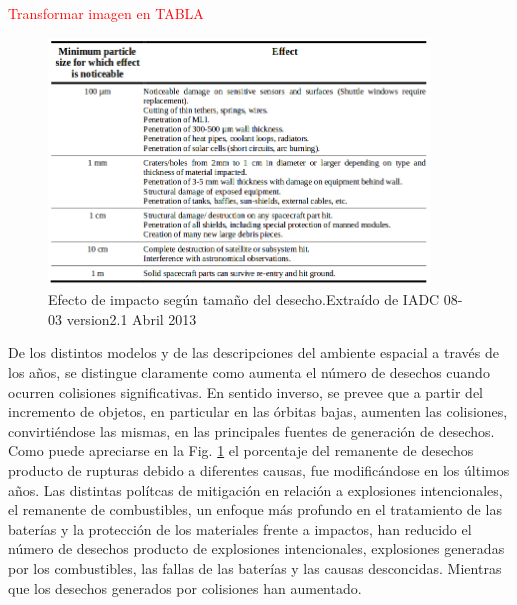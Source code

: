 \textcolor{red}{Transformar imagen en TABLA}
\begin{figure}[!h]
  \centering
  \includegraphics[width=0.9\textwidth]{imagenes/danioxtamanio}
  \caption[Efecto de impacto seg\'un tama\~no del desecho.]{Efecto de impacto seg\'un tama\~no del desecho.Extra\'ido de IADC 08-03 version2.1 Abril 2013 }
  \label{fig:causadesechos}
\end{figure}


De los distintos modelos y de las descripciones del ambiente espacial a trav\'es de los a\~nos, se distingue claramente como aumenta el n\'umero de desechos cuando ocurren colisiones significativas. En sentido inverso, se prevee que a partir del incremento de objetos, en particular en las \'orbitas bajas, aumenten las colisiones, convirti\'endose las mismas, en las principales fuentes de generaci\'on de desechos.\\ 

Como puede apreciarse en la Fig. \ref{fig:causadesechos} el porcentaje del remanente de desechos producto de rupturas debido a diferentes causas, fue modific\'andose en los \'ultimos a\~nos. Las distintas pol\'itcas de mitigaci\'on en relaci\'on a explosiones intencionales, el remanente de combustibles, un enfoque m\'as profundo en el tratamiento de las bater\'ias y la protecci\'on de los materiales frente a impactos, han reducido el n\'umero de desechos producto de explosiones intencionales, explosiones generadas por los combustibles, las fallas de las bater\'ias y  las causas desconcidas. Mientras que los desechos generados por colisiones han aumentado.\\


